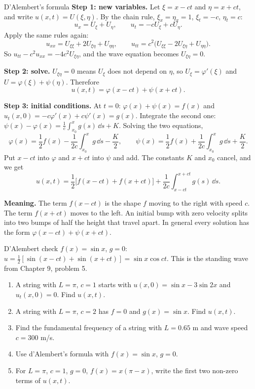 \begin{derivbox}{D'Alembert's formula}
\textbf{Step 1: new variables.} Let $\xi = x - ct$ and $\eta = x + ct$, and write $u(x,t) = U(\xi,\eta)$. By the chain rule, $\xi_x = \eta_x = 1$, $\xi_t = -c$, $\eta_t = c$:
\[ u_x = U_\xi + U_\eta,\qquad u_t = -cU_\xi + cU_\eta. \]
Apply the same rules again:
\[ u_{xx} = U_{\xi\xi} + 2U_{\xi\eta} + U_{\eta\eta},\qquad u_{tt} = c^2\big(U_{\xi\xi} - 2U_{\xi\eta} + U_{\eta\eta}\big). \]
So $u_{tt} - c^2u_{xx} = -4c^2U_{\xi\eta}$, and the wave equation becomes $U_{\xi\eta} = 0$.

\textbf{Step 2: solve.} $U_{\xi\eta} = 0$ means $U_\xi$ does not depend on $\eta$, so $U_\xi = \varphi'(\xi)$ and $U = \varphi(\xi) + \psi(\eta)$. Therefore
\[ u(x,t) = \varphi(x - ct) + \psi(x + ct). \]

\textbf{Step 3: initial conditions.} At $t=0$: $\varphi(x) + \psi(x) = f(x)$ and $u_t(x,0) = -c\varphi'(x) + c\psi'(x) = g(x)$. Integrate the second one: $\psi(x) - \varphi(x) = \frac1c\int_{x_0}^xg(s)\,\dd s + K$. Solving the two equations,
\[ \varphi(x) = \frac12f(x) - \frac1{2c}\int_{x_0}^xg\,\dd s - \frac K2,\qquad \psi(x) = \frac12f(x) + \frac1{2c}\int_{x_0}^xg\,\dd s + \frac K2. \]
Put $x - ct$ into $\varphi$ and $x+ct$ into $\psi$ and add. The constants $K$ and $x_0$ cancel, and we get
\[ u(x,t) = \frac12\big[f(x-ct) + f(x+ct)\big] + \frac1{2c}\int_{x-ct}^{x+ct}g(s)\,\dd s. \]
\end{derivbox}

\textbf{Meaning.} The term $f(x-ct)$ is the shape $f$ moving to the right with speed $c$. The term $f(x+ct)$ moves to the left. An initial bump with zero velocity splits into two bumps of half the height that travel apart. In general every solution has the form $\varphi(x-ct) + \psi(x+ct)$.

\begin{examplebox}{D'Alembert check}
$f(x)=\sin x$, $g=0$: $u = \tfrac12[\sin(x-ct) + \sin(x+ct)] = \sin x\cos ct$. This is the standing wave from Chapter 9, problem 5. \checkmark
\end{examplebox}

\begin{practicebox}
\begin{enumerate}
  \item A string with $L=\pi$, $c=1$ starts with $u(x,0) = \sin x - 3\sin 2x$ and $u_t(x,0)=0$. Find $u(x,t)$.
  \item A string with $L=\pi$, $c=2$ has $f=0$ and $g(x) = \sin x$. Find $u(x,t)$.
  \item Find the fundamental frequency of a string with $L=0.65$ m and wave speed $c=300$ m/s.
  \item Use d'Alembert's formula with $f(x) = \sin x$, $g=0$.
  \item For $L = \pi$, $c=1$, $g=0$, $f(x)=x(\pi - x)$, write the first two non-zero terms of $u(x,t)$.
\end{enumerate}
\end{practicebox}

